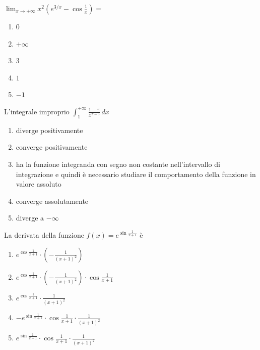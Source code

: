 \begin{quiz}
$\displaystyle\lim_{x\to+\infty}x^2\left(e^{3/x}-\cos\frac1x\right)=$
\begin{enumerate}
\item $0$
\item $+\infty$
\item $3$
\item $1$
\item $-1$
\end{enumerate}
\end{quiz}

\begin{quiz}
L'integrale improprio $\displaystyle\int_1^{+\infty}\frac{1-\pi}{x^{\pi-3}}\,dx$
\begin{enumerate}
\item diverge positivamente
\item converge positivamente
\item ha la funzione integranda con segno non costante nell'intervallo di integrazione e quindi \`e necessario studiare il comportamento della funzione in valore assoluto
\item converge assolutamente
\item diverge a $-\infty$
\end{enumerate}
\end{quiz}

\begin{quiz}
La derivata della funzione $f(x)=e^{\sin\frac1{x+1}}$ \`e
\begin{enumerate}
\item $e^{\cos\frac1{x+1}}\cdot\left(-\frac1{(x+1)^2}\right)$
\item $e^{\cos\frac1{x+1}}\cdot\left(-\frac1{(x+1)^2}\right)\cdot\cos\frac1{x+1}$
\item $e^{\cos\frac1{x+1}}\cdot\frac1{(x+1)^2}$
\item $-e^{\sin\frac1{x+1}}\cdot\cos\frac1{x+1}\cdot\frac1{(x+1)^2}$
\item $e^{\sin\frac1{x+1}}\cdot\cos\frac1{x+1}\cdot\frac1{(x+1)^2}$
\end{enumerate}
\end{quiz}

